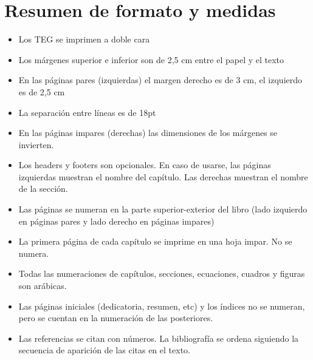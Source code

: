 \chapter{Resumen de formato y medidas}
\begin{itemize}
\item Los TEG se imprimen a doble cara 
\item Los márgenes superior e inferior son de 2,5 cm entre el papel y el texto 
\item En las páginas pares (izquierdas) el margen derecho es de 3 cm, el izquierdo es de 2,5 cm
\item La separaci\'on entre l\'ineas es de 18pt 
\item En las páginas impares (derechas) las dimensiones de los márgenes se invierten.
\item Los headers y footers son opcionales. En caso de usarse, las páginas izquierdas muestran el nombre del capítulo. Las derechas muestran el nombre de la sección.
\item Las páginas se numeran en la parte superior-exterior del libro (lado izquierdo en páginas pares y lado derecho en páginas impares)
\item La primera página de cada capítulo se imprime en una hoja impar. No se numera.
\item Todas las numeraciones de capítulos, secciones, ecuaciones, cuadros y figuras son arábicas. 
\item Las páginas iniciales (dedicatoria, resumen, etc) y los índices no se numeran, pero se cuentan en la numeración de las posteriores.
\item Las referencias se citan con números. La bibliografía se ordena siguiendo la secuencia de aparición de las citas en el texto.
\end{itemize}
%
\cleardoublepage
\thispagestyle{empty}
\AddToShipoutPicture*{\BackgroundPic}
